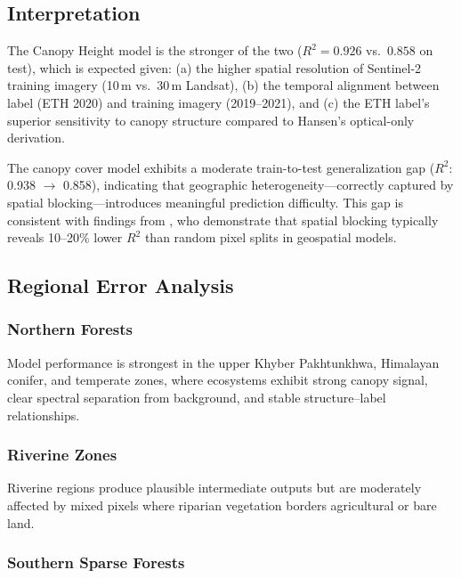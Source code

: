 \documentclass[12pt,a4paper,twoside]{article}
\begin{document}
\subsection{Interpretation}

The Canopy Height model is the stronger of the two ($R^{2} = 0.926$ vs.\ $0.858$
on test), which is expected given: (a) the higher spatial resolution of Sentinel-2
training imagery (10\,m vs.\ 30\,m Landsat), (b) the temporal alignment between
label (ETH 2020) and training imagery (2019--2021), and (c) the ETH label's
superior sensitivity to canopy structure compared to Hansen's optical-only
derivation.

The canopy cover model exhibits a moderate train-to-test generalization gap
($R^{2}$: 0.938 $\to$ 0.858), indicating that geographic heterogeneity---correctly
captured by spatial blocking---introduces meaningful prediction difficulty.  This
gap is consistent with findings from \citet{Roberts2017}, who demonstrate that
spatial blocking typically reveals 10--20\% lower $R^{2}$ than random pixel splits
in geospatial models.

\subsection{Regional Error Analysis}

\subsubsection{Northern Forests}

Model performance is strongest in the upper Khyber Pakhtunkhwa, Himalayan conifer,
and temperate zones, where ecosystems exhibit strong canopy signal, clear spectral
separation from background, and stable structure--label relationships.

\subsubsection{Riverine Zones}

Riverine regions produce plausible intermediate outputs but are moderately affected
by mixed pixels where riparian vegetation borders agricultural or bare land.

\subsubsection{Southern Sparse Forests}
\end{document}
